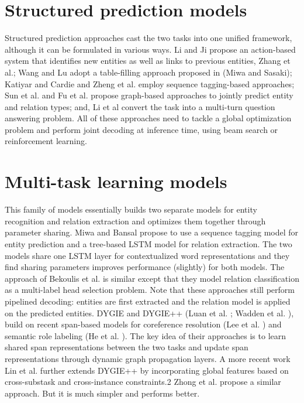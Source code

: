 \section{Structured prediction models}
Structured prediction approaches cast the two tasks into one unified framework, although it can be formulated in various ways.
Li and Ji\cite{li-ji-2014-incremental} propose an action-based system that identifies new entities as well as links to previous entities, Zhang et al.\cite{zhang-etal-2017-end};
Wang and Lu\cite{wang-lu-2020-two} adopt a table-filling approach proposed in (Miwa and Sasaki\cite{miwa-sasaki-2014-modeling});
Katiyar and Cardie\cite{katiyar-cardie-2017-going} and Zheng et al.\cite{zheng-etal-2017-joint} employ sequence tagging-based approaches;
Sun et al.\cite{sun-etal-2019-joint} and Fu et al.\cite{fu-etal-2019-graphrel} propose graph-based approaches to jointly predict entity and relation types;
and, Li et al\cite{li-etal-2019-entity} convert the task into a multi-turn question answering problem.
All of these approaches need to tackle a global optimization problem and perform joint decoding at inference time, using beam search or reinforcement learning.

\section{Multi-task learning models}
This family of models essentially builds two separate models for entity recognition and relation extraction and optimizes them together through parameter sharing.
Miwa and Bansal\cite{miwa-bansal-2016-end} propose to use a sequence tagging model for entity prediction and a tree-based LSTM model for relation extraction. The two models share one LSTM layer for contextualized word representations and they find sharing parameters improves performance (slightly) for both models.
The approach of Bekoulis et al.\cite{bekoulis-etal-2018-adversarial} is similar except that they model relation classification as a multi-label head selection problem. Note that these approaches still perform pipelined decoding: entities are first extracted and the relation model is applied on the predicted entities.
DYGIE and DYGIE++ (Luan et al. \cite{luan-etal-2019-general}; Wadden et al. \cite{Wadden2019EntityRA}), build on recent span-based models for coreference resolution (Lee et al. \cite{lee-etal-2017-end}) and semantic role labeling (He et al. \cite{he-etal-2018-jointly}). The key idea of their approaches is to learn shared span representations between the two tasks and update span representations through dynamic graph propagation layers.
A more recent work Lin et al.\cite{lin-etal-2020-joint} further extends DYGIE++ by incorporating global features based on cross-substask and cross-instance constraints.2
Zhong et al. \cite{Zhong2020AFE} propose a similar approach. But it is much simpler and performs better.



